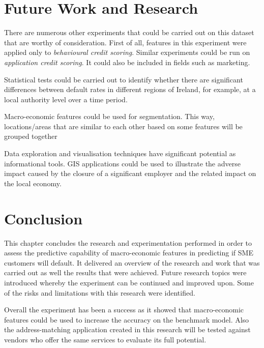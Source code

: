 \section{Future Work and Research}

There are numerous other experiments that could be carried out on this dataset that are worthy of consideration. First of all, features in this experiment were applied only to \textit{behavioural credit scoring}. Similar experiments could be run on \textit{application credit scoring}. It could also be included in fields such as marketing.

Statistical tests could be carried out to identify whether there are significant differences between default rates in different regions of Ireland, for example, at a local authority level over a time period. 

Macro-economic features could be used for segmentation. This way, locations/areas that are similar to each other based on some features will be grouped together

Data exploration and visualisation techniques have significant potential as informational tools. GIS applications could be used to illustrate the adverse impact caused by the closure of a significant employer and the related impact on the local economy.
\section{Conclusion}
This chapter concludes the research and experimentation performed in order to assess the predictive capability of macro-economic features in predicting if SME customers will default. It delivered an overview of the research and work that was carried out as well the results that were achieved. Future research topics were introduced whereby the experiment can be continued and improved upon. Some of the risks and limitations with this research were identified.

Overall the experiment has been a success as it showed that macro-economic features could be used to increase the accuracy on the benchmark model. Also the address-matching application created in this research will be tested against vendors who offer the same services to evaluate its full potential.









